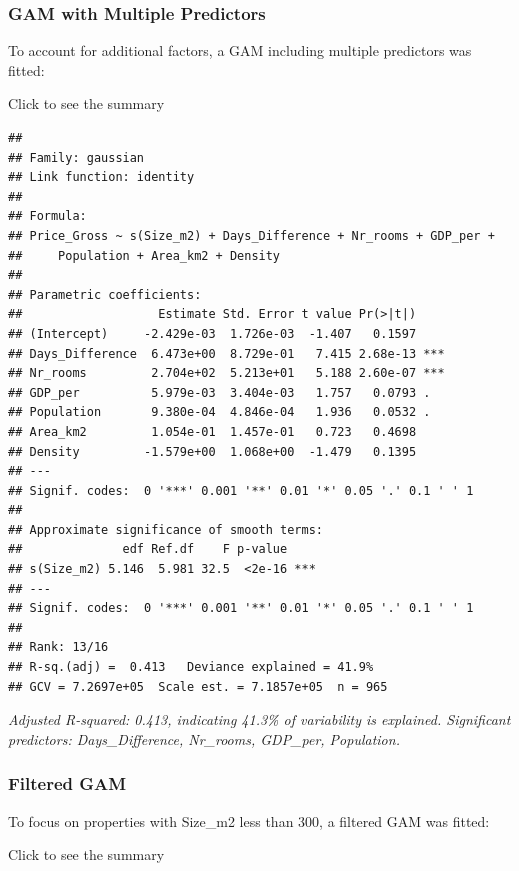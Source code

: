\documentclass[
]{article}
\begin{document}
\subsubsection{GAM with Multiple
Predictors}\label{gam-with-multiple-predictors}

To account for additional factors, a GAM including multiple predictors
was fitted:

Click to see the summary

\begin{verbatim}
## 
## Family: gaussian 
## Link function: identity 
## 
## Formula:
## Price_Gross ~ s(Size_m2) + Days_Difference + Nr_rooms + GDP_per + 
##     Population + Area_km2 + Density
## 
## Parametric coefficients:
##                   Estimate Std. Error t value Pr(>|t|)    
## (Intercept)     -2.429e-03  1.726e-03  -1.407   0.1597    
## Days_Difference  6.473e+00  8.729e-01   7.415 2.68e-13 ***
## Nr_rooms         2.704e+02  5.213e+01   5.188 2.60e-07 ***
## GDP_per          5.979e-03  3.404e-03   1.757   0.0793 .  
## Population       9.380e-04  4.846e-04   1.936   0.0532 .  
## Area_km2         1.054e-01  1.457e-01   0.723   0.4698    
## Density         -1.579e+00  1.068e+00  -1.479   0.1395    
## ---
## Signif. codes:  0 '***' 0.001 '**' 0.01 '*' 0.05 '.' 0.1 ' ' 1
## 
## Approximate significance of smooth terms:
##              edf Ref.df    F p-value    
## s(Size_m2) 5.146  5.981 32.5  <2e-16 ***
## ---
## Signif. codes:  0 '***' 0.001 '**' 0.01 '*' 0.05 '.' 0.1 ' ' 1
## 
## Rank: 13/16
## R-sq.(adj) =  0.413   Deviance explained = 41.9%
## GCV = 7.2697e+05  Scale est. = 7.1857e+05  n = 965
\end{verbatim}

\emph{Adjusted R-squared: 0.413, indicating 41.3\% of variability is
explained. Significant predictors: Days\_Difference, Nr\_rooms,
GDP\_per, Population.}

\subsubsection{Filtered GAM}\label{filtered-gam}

To focus on properties with Size\_m2 less than 300, a filtered GAM was
fitted:

Click to see the summary
\end{document}
